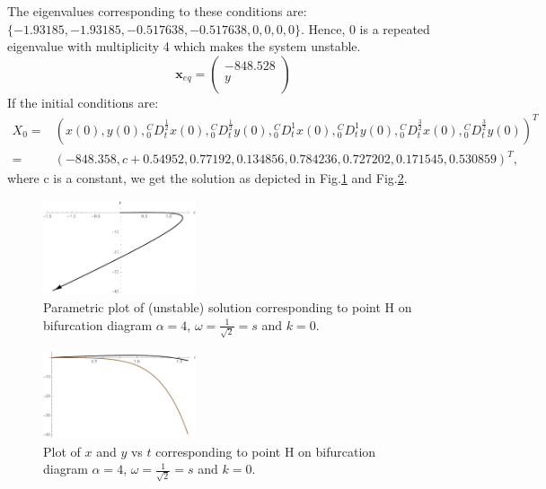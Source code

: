 \documentclass[pdflatex,sn-mathphys]{sn-jnl}%
\theoremstyle{thmstyleone}%
\theoremstyle{thmstyletwo}%
\theoremstyle{thmstylethree}%
\begin{document}
The eigenvalues corresponding to these conditions are:$ \{-1.93185,-1.93185,-0.517638,-0.517638,0,0,0,0\}$.
Hence, $0$ is a repeated eigenvalue with multiplicity 4 which makes the system unstable. 
$$\mathbf{x}_{eq}=
\left(
\begin{array}{c}
-848.528 \\
y \\
\end{array}
\right)$$
If the initial conditions are:\begin{align*}
X_{0}=&
\left(
x(0) ,
y(0) ,
{ }_{0}^{C}D_{t}^{\frac{1}{2}}x(0) ,
{ }_{0}^{C}D_{t}^{\frac{1}{2}}y(0) ,
{ }_{0}^{C}D_{t}^{1} x(0) ,
{ }_{0}^{C}D_{t}^{1}y(0) ,
{ }_{0}^{C}D_{t}^{\frac{3}{2}}x(0) ,
{ }_{0}^{C}D_{t}^{\frac{3}{2}}y(0)
\right)^T \\ =& \left(
 -848.358 ,
 c+0.54952 ,
 0.77192,
 0.134856,
 0.784236,
 0.727202,
 0.171545,
 0.530859 
\right)^T,
\end{align*}
where c is a constant, we get the solution as depicted in Fig.\ref{fig:Unstable parametric Point H} and Fig.\ref{fig: Unstable  Point H}.
   \begin{figure}
  \centering
    \includegraphics[width=0.4\textwidth]{ais4wisroot2}
    \caption{Parametric plot of (unstable) solution corresponding to point H on bifurcation diagram $\alpha = 4$, $\omega=\frac{1}{\sqrt{2}}=s$ and $k=0$.}
    \label{fig:Unstable parametric Point H}   
 
\end{figure}

\begin{figure}[h]%
\centering
 \includegraphics[width=0.4\textwidth]{ais4wisroot2Plot}
    \caption{Plot of $x$ and $y$ vs $t$ corresponding to point H on bifurcation diagram $\alpha = 4$, $\omega=\frac{1}{\sqrt{2}}=s$ and $k=0$.}
    \label{fig: Unstable  Point H}
\end{figure}
\end{document}
